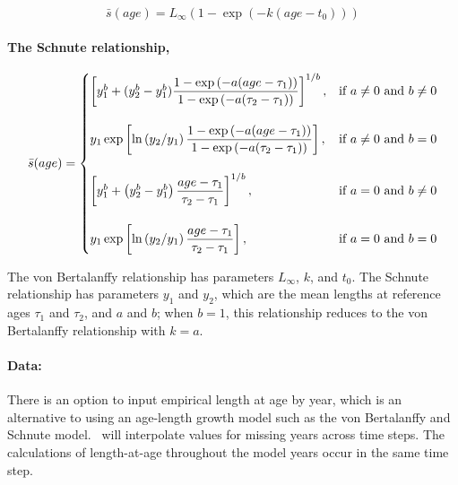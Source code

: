 \begin{equation}
\bar{s}(age)= L_\infty \left( 1 - \exp \left( -k \left(age-t_0 \right) \right) \right)
\end{equation}

\paragraph[Schnute]{The Schnute relationship, }

\begin{equation}
\bar{s}(age)=\displaystyle\begin{cases}
  \left[ y_1^b + (y_2^b - y_1^b) \dfrac{1-\exp \left(-a(age - \tau_1) \right)}{1-\exp \left(-a(\tau_2 - \tau_1) \right)} \right]^{1/b}, & \text{if $a\ne0$ and $b\ne0$} \\
  \AddVspace
  y_1 \exp \left[ \ln \left( y_2 / y_1 \right) \dfrac{1-\exp \left(-a(age - \tau_1) \right)}{1-\exp \left(-a(\tau_2 - \tau_1) \right)} \right], & \text{if $a\ne0$ and $b=0$} \\
  \AddVspace
  \left[ y_1^b + \left( y_2^b - y_1^b \right) \dfrac{age-\tau_1}{\tau_2 - \tau_1} \right]^{1/b}, & \text{if $a=0$ and $b\ne0$} \\
  \AddVspace
  y_1 \exp \left[ \ln \left( y_2/y_1 \right) \dfrac{age-\tau_1}{\tau_2 - \tau_1} \right] , & \text{if $a=0$ and $b=0$} \\
  \end{cases}
\end{equation}

The von Bertalanffy relationship has parameters $L_\infty$, $k$, and $t_0$. The Schnute relationship \citep{836} has parameters $y_1$ and $y_2$, which are the mean lengths at reference ages $\tau_1$ and $\tau_2$, and $a$ and $b$; when $b=1$, this relationship reduces to the von Bertalanffy relationship with $k=a$.

\paragraph{Data: }

There is an option to input empirical length at age by year, which is an alternative to using an age-length growth model such as the von Bertalanffy and Schnute model. \CNAME~will interpolate values for missing years across time steps. The calculations of length-at-age throughout the model years occur in the same time step.

